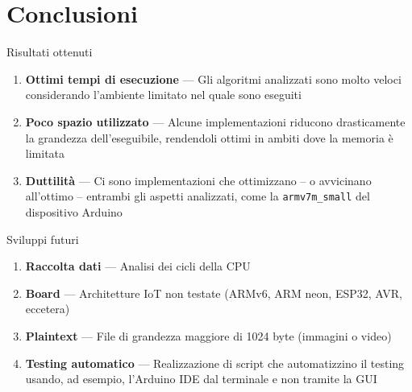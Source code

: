 \section{Conclusioni}


\begin{frame}{Risultati ottenuti}

\begin{enumerate}[<+->]
    \item \textbf{Ottimi tempi di esecuzione} --- Gli algoritmi analizzati sono molto veloci considerando l'ambiente limitato nel quale sono eseguiti
    \item \textbf{Poco spazio utilizzato} --- Alcune implementazioni riducono drasticamente la grandezza dell'eseguibile, rendendoli ottimi in ambiti dove la memoria è limitata
    \item \textbf{Duttilità} --- Ci sono implementazioni che ottimizzano -- o avvicinano all'ottimo -- entrambi gli aspetti analizzati, come la \texttt{armv7m\_small} del dispositivo Arduino
\end{enumerate}

\end{frame}


\begin{frame}{Sviluppi futuri}

\begin{enumerate}[<+->]
    \item \textbf{Raccolta dati} --- Analisi dei cicli della CPU
    \item \textbf{Board} --- Architetture IoT non testate (ARMv6, ARM neon, ESP32, AVR, eccetera)
    \item \textbf{Plaintext} --- File di grandezza maggiore di 1024 byte (immagini o video)
    \item \textbf{Testing automatico} --- Realizzazione di script che automatizzino il testing usando, ad esempio, l'Arduino IDE dal terminale e non tramite la GUI
\end{enumerate}

\end{frame}
